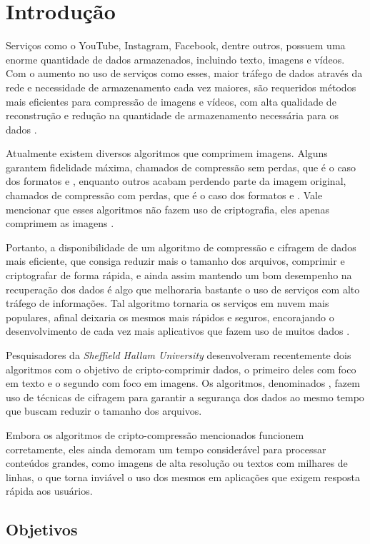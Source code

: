 \chapter{Introdução}
\label{cap1}

Serviços como o YouTube, Instagram, Facebook, dentre outros, possuem uma enorme quantidade de dados armazenados, incluindo texto, imagens e vídeos. Com o aumento no uso de serviços como esses, maior tráfego de dados através da rede e necessidade de armazenamento cada vez maiores, são requeridos métodos mais eficientes para compressão de imagens e vídeos, com alta qualidade de reconstrução e redução na quantidade de armazenamento necessária para os dados \cite{shu13715}.

Atualmente existem diversos algoritmos que comprimem imagens. Alguns garantem fidelidade máxima, chamados de compressão sem perdas, que é o caso dos formatos \png e \tiff, enquanto outros acabam perdendo parte da imagem original, chamados de compressão com perdas, que é o caso dos formatos \jpeg e \gif. Vale mencionar que esses algoritmos não fazem uso de criptografia, eles apenas comprimem as imagens \cite{Salomon2007}.

Portanto, a disponibilidade de um algoritmo de compressão e cifragem de dados mais eficiente, que consiga reduzir mais o tamanho dos arquivos, comprimir e criptografar de forma rápida, e ainda assim mantendo um bom desempenho na recuperação dos dados é algo que melhoraria bastante o uso de serviços com alto tráfego de informações. Tal algoritmo tornaria os serviços em nuvem mais populares, afinal deixaria os mesmos mais rápidos e seguros, encorajando o desenvolvimento de cada vez mais aplicativos que fazem uso de muitos dados \cite{Stallings2014}.

Pesquisadores da \textit{Sheffield Hallam University} desenvolveram recentemente dois algoritmos com o objetivo de cripto-comprimir dados, o primeiro deles com foco em texto e o segundo com foco em imagens. Os algoritmos, denominados \gmpr \cite{shu13715}, fazem uso de técnicas de cifragem para garantir a segurança dos dados ao mesmo tempo que buscam reduzir o tamanho dos arquivos.

Embora os algoritmos de cripto-compressão mencionados funcionem corretamente, eles ainda demoram um tempo considerável para processar conteúdos grandes, como imagens de alta resolução ou textos com milhares de linhas, o que torna inviável o uso dos mesmos em aplicações que exigem resposta rápida aos usuários.

\section{Objetivos}

